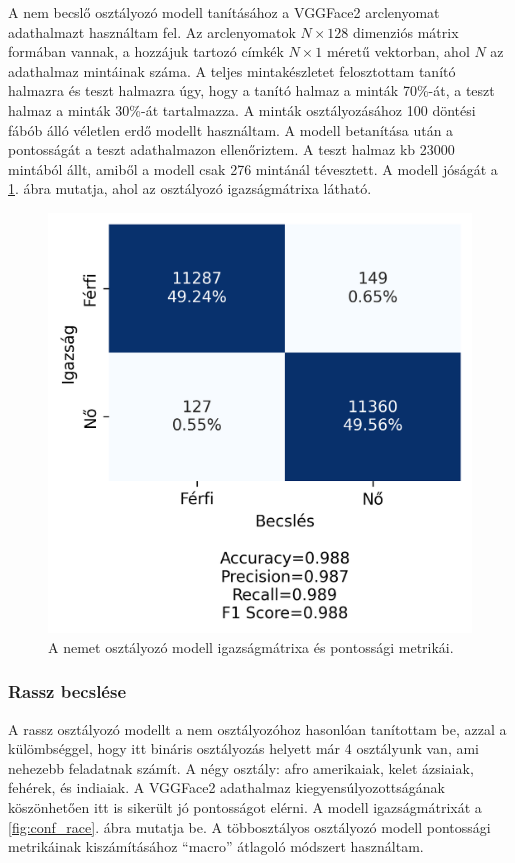 A nem becslő osztályozó modell tanításához a VGGFace2 arclenyomat adathalmazt használtam fel. Az arclenyomatok $N\times128$ dimenziós mátrix formában vannak, a hozzájuk tartozó címkék $N\times1$ méretű vektorban, ahol $N$ az adathalmaz mintáinak száma. A teljes mintakészletet felosztottam tanító halmazra és teszt halmazra úgy, hogy a tanító halmaz a minták 70\%-át, a teszt halmaz a minták 30\%-át tartalmazza. A minták osztályozásához 100 döntési fábób álló véletlen erdő modellt használtam. A modell betanítása után a pontosságát a teszt adathalmazon ellenőriztem. A teszt halmaz kb 23000 mintából állt, amiből a modell csak 276 mintánál tévesztett. A modell jóságát a \ref{fig:conf_sex}. ábra mutatja, ahol az osztályozó igazságmátrixa látható. 
\begin{figure}[ht]
	\centering
	\includegraphics[width=0.55\columnwidth]{figures/conf_sex.png}
	\caption{A nemet osztályozó modell igazságmátrixa és pontossági metrikái.}
	\label{fig:conf_sex}
\end{figure}

\subsubsection*{Rassz becslése}
A rassz osztályozó modellt a nem osztályozóhoz hasonlóan tanítottam be, azzal a külömbséggel, hogy itt bináris osztályozás helyett már 4 osztályunk van, ami nehezebb feladatnak számít. A négy osztály: afro amerikaiak, kelet ázsiaiak, fehérek, és indiaiak. A VGGFace2 adathalmaz kiegyensúlyozottságának köszönhetően itt is sikerült jó pontosságot elérni. A modell igazságmátrixát a \ref{fig:conf_race}. ábra mutatja be. A többosztályos osztályozó modell pontossági metrikáinak kiszámításához ``macro'' átlagoló módszert használtam.

